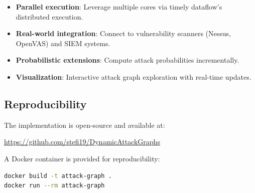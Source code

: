 \documentclass[conference]{IEEEtran}
\begin{document}
\begin{itemize}
    \item \textbf{Parallel execution}: Leverage multiple cores via timely dataflow's distributed execution.
    \item \textbf{Real-world integration}: Connect to vulnerability scanners (Nessus, OpenVAS) and SIEM systems.
    \item \textbf{Probabilistic extensions}: Compute attack probabilities incrementally.
    \item \textbf{Visualization}: Interactive attack graph exploration with real-time updates.
\end{itemize}

\subsection{Reproducibility}

The implementation is open-source and available at:
\begin{center}
\url{https://github.com/stefi19/DynamicAttackGraphs}
\end{center}

A Docker container is provided for reproducibility:
\begin{lstlisting}[language=bash, frame=none, numbers=none]
docker build -t attack-graph .
docker run --rm attack-graph
\end{lstlisting}



\end{document}
